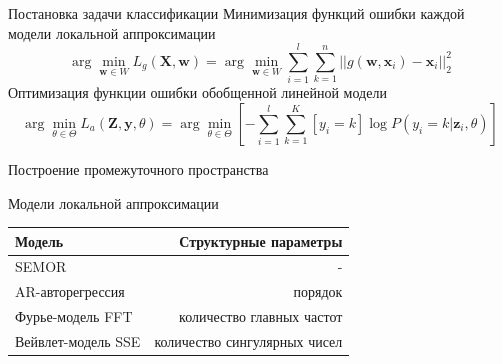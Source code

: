 \documentclass{beamer}
\newcommand{\bz}{\mathbf{z}}
\newcommand{\bx}{\mathbf{x}}
\newcommand{\by}{\mathbf{y}}
\newcommand{\bw}{\mathbf{w}}
\newcommand{\bX}{\mathbf{X}}
\newcommand{\bZ}{\mathbf{Z}}
\newcommand{\sbrs}[1]{\left[#1\right]}
\begin{document}

\begin{frame}{Постановка задачи классификации}
    Минимизация функций ошибки каждой модели локальной аппроксимации
    $$
    \arg\min_{\bw \in W} L_g(\bX, \bw) = \arg\min_{\bw \in W} \sum_{i=1}^l\sum_{k=1}^n ||g(\bw, \bx_i) - \bx_i||_2^2
    $$
    Оптимизация функции ошибки обобщенной линейной модели
    $$
    \arg\min_{\theta \in \Theta} L_a(\bZ, \by, \mathbb{\theta}) = \arg\min_{\mathbb{\theta} \in \Theta} \sbrs{-\sum_{i=1}^l\sum_{k=1}^K [y_i = k]\log P(y_i = k| \bz_i, \mathbb{\theta})}
    $$
\end{frame}



\begin{frame}{Построение промежуточного пространства}
    \begin{block}{Модели локальной аппроксимации}
    \begin{center}
        \begin{tabular}{|l|r|}
            \hline
            Модель & Структурные параметры \\
            \hline
            SEMOR & - \\
            AR-авторегрессия & порядок \\
            Фурье-модель FFT & количество главных частот \\
            Вейвлет-модель SSE & количество сингулярных чисел\\
            \hline
            \end{tabular}
    \end{center}
    \end{block}
\end{frame}

\end{document}
